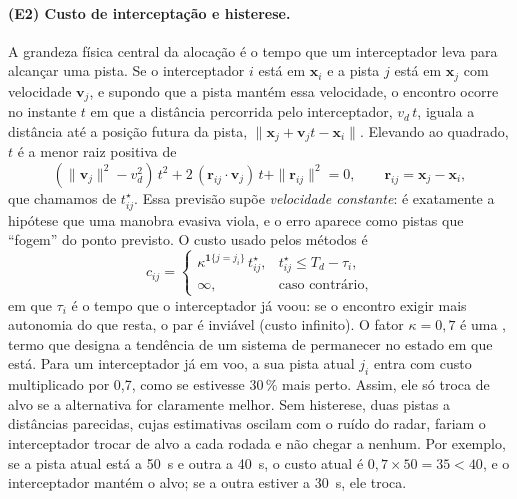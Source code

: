 \paragraph{(E2) Custo de interceptação e histerese.} A grandeza física central da alocação é o tempo que um interceptador
leva para alcançar uma pista. Se o interceptador $i$ está em $\bm{x}_i$ e a pista $j$ está em $\bm{x}_j$ com velocidade
$\bm{v}_j$, e supondo que a pista mantém essa velocidade, o encontro ocorre no instante $t$ em que a distância percorrida
pelo interceptador, $v_d\,t$, iguala a distância até a posição futura da pista, $\|\bm{x}_j+\bm{v}_jt-\bm{x}_i\|$. Elevando
ao quadrado, $t$ é a menor raiz positiva de
\begin{equation}
  (\|\bm{v}_j\|^2-v_d^2)\,t^2+2\,(\bm{r}_{ij}\!\cdot\!\bm{v}_j)\,t+\|\bm{r}_{ij}\|^2=0,\qquad \bm{r}_{ij}=\bm{x}_j-\bm{x}_i,
  \label{eq:tint}
\end{equation}
que chamamos de  $t^\star_{ij}$. Essa previsão supõe \emph{velocidade
constante}: é exatamente a hipótese que uma manobra evasiva viola, e o erro aparece como pistas que ``fogem'' do ponto
previsto. O custo usado pelos métodos é
\begin{equation}
  c_{ij} = \begin{cases} \kappa^{\mathbf{1}\{j=j_i\}}\,t^\star_{ij}, & t^\star_{ij}\le T_d-\tau_i,\\ \infty, & \text{caso contrário,}\end{cases}
  \label{eq:custo}
\end{equation}
em que $\tau_i$ é o tempo que o interceptador já voou: se o encontro exigir mais autonomia do que resta, o par é
inviável (custo infinito). O fator $\kappa=0{,}7$ é uma , termo que designa a tendência de um sistema
de permanecer no estado em que está. Para um interceptador já em voo, a sua pista atual $j_i$ entra com custo
multiplicado por 0,7, como se estivesse 30\,\% mais perto. Assim, ele só troca de alvo se a alternativa for claramente
melhor. Sem histerese, duas pistas a distâncias parecidas, cujas estimativas oscilam com o ruído do radar, fariam o
interceptador trocar de alvo a cada rodada e não chegar a nenhum. Por exemplo, se a pista atual está a 50~s e outra a
40~s, o custo atual é $0{,}7\times50=35<40$, e o interceptador mantém o alvo; se a outra estiver a 30~s, ele troca.

